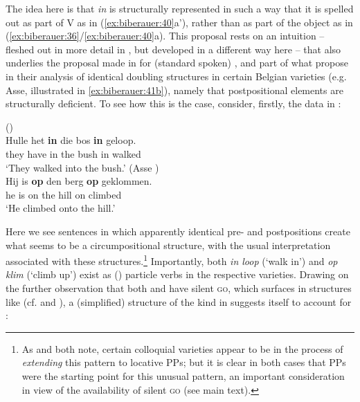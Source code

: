 \documentclass[output=paper]{LSP/langsci}
\begin{document}
The idea here is that \textit{in} is structurally represented in such a way that it is spelled out as part of V as in (\ref{ex:biberauer:40}a’), rather than as part of the object as in (\ref{ex:biberauer:36}/\ref{ex:biberauer:40}a). This proposal rests on an intuition – fleshed out in more detail in \citet{Pretorius2015,PretoriusInProgress}, but developed in a different way here – that also underlies the proposal made in \citet{denDikken2010getgo} for (standard spoken) , and part of what \citet{AelbrechtdenDikken2013} propose in their analysis of identical doubling structures in certain Belgian varieties (e.g. Asse, illustrated in \ref{ex:biberauer:41b}), namely that postpositional elements are structurally deficient. To see how this is the case, consider, firstly, the data in :

\ea%
    \label{ex:biberauer:41}

	 \ea ()\\
\gll Hulle het      \textbf{in} die bos    \textbf{in} geloop.    \\
    they   have   in  the bush in  walked\\
  \glt ‘They walked into the bush.’
\largerpage[2]
 \ex (Asse )\label{ex:biberauer:41b}\\
\gll  Hij is \textbf{op}  den berg \textbf{op} geklommen.  \\
    he  is on  the   hill  on  climbed\\
  \glt ‘He climbed onto the hill.’
\z
\z

Here we see sentences in which apparently identical pre- and postpositions create what seems to be a circumpositional structure, with the usual  interpretation associated with these structures.\footnote{As \citet{Oosthuizen2000} and   \citet{AelbrechtdenDikken2013} both note, certain colloquial varieties appear to be in the process of \textit{extending} this pattern to locative PPs; but it is clear in both cases that  PPs were the starting point for this unusual pattern, an important consideration in view of the availability of silent \textsc{go} (see main text).}  Importantly, both \textit{in loop} (‘walk in’) and \textit{op klim} (‘climb up’) exist as () particle verbs in the respective varieties. Drawing on the further observation that both  and  have silent \textsc{go}, which surfaces in structures like  (cf.  \citealt{vanRiemsdijk2002} and \citealt{BiberauerOosthuizen2011}), a (simplified) structure of the kind in  suggests itself to account for :
\end{document}
